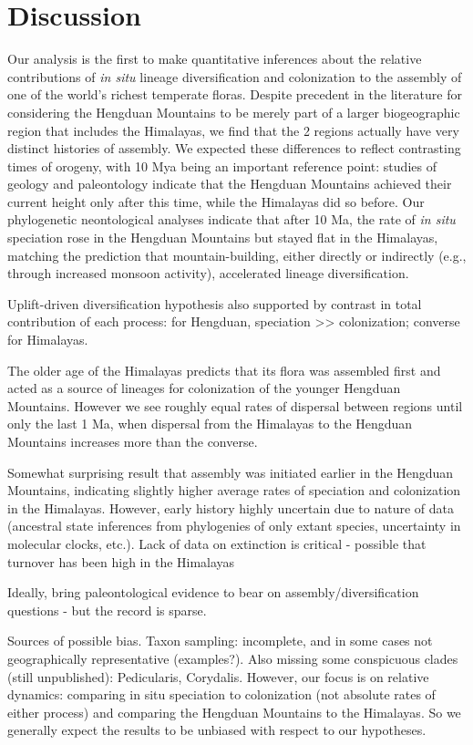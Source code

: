\section{Discussion}

Our analysis is the first to make quantitative inferences about the relative contributions of \textit{in situ} lineage diversification and colonization to the assembly of one of the world's richest temperate floras. Despite precedent in the literature for considering the Hengduan Mountains to be merely part of a larger biogeographic region that includes the Himalayas, we find that the 2 regions actually have very distinct histories of assembly. We expected these differences to reflect contrasting times of orogeny, with 10 Mya being an important reference point: studies of geology and paleontology indicate that the Hengduan Mountains achieved their current height only after this time, while the Himalayas did so before. Our phylogenetic neontological analyses indicate that after 10 Ma, the rate of \textit{in situ} speciation rose in the Hengduan Mountains but stayed flat in the Himalayas, matching the prediction that mountain-building, either directly or indirectly (e.g., through increased monsoon activity), accelerated lineage diversification.

Uplift-driven diversification hypothesis also supported by contrast in total contribution of each process: for Hengduan, speciation >> colonization; converse for Himalayas.

The older age of the Himalayas predicts that its flora was assembled first and acted as a source of lineages for colonization of the younger Hengduan Mountains. However we see roughly equal rates of dispersal between regions until only the last 1 Ma, when dispersal from the Himalayas to the Hengduan Mountains increases more than the converse. 

Somewhat surprising result that assembly was initiated earlier in the Hengduan Mountains, indicating slightly higher average rates of speciation and colonization in the Himalayas. However, early history highly uncertain due to nature of data (ancestral state inferences from phylogenies of only extant species, uncertainty in molecular clocks, etc.). Lack of data on extinction is critical - possible that turnover has been high in the Himalayas

Ideally, bring paleontological evidence to bear on assembly/diversification questions - but the record is sparse.

Sources of possible bias. Taxon sampling: incomplete, and in some cases not geographically representative (examples?). Also missing some conspicuous clades (still unpublished): Pedicularis, Corydalis. However, our focus is on relative dynamics: comparing in situ speciation to colonization (not absolute rates of either process) and comparing the Hengduan Mountains to the Himalayas. So we generally expect the results to be unbiased with respect to our hypotheses.
